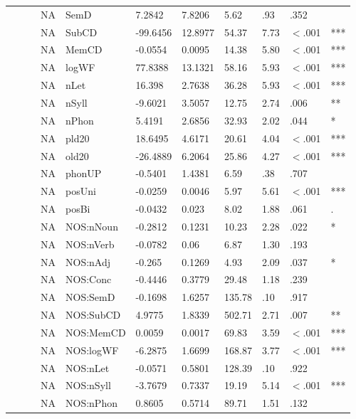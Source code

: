 \begin{table}[ht]
\begin{tabular}{lllllllllll}
   &  &  & NA & SemD & 7.2842 & 7.8206 & 5.62 & .93 & .352 &   \\ 
   &  &  & NA & SubCD & -99.6456 & 12.8977 & 54.37 & 7.73 & $<$.001 & *** \\ 
   &  &  & NA & MemCD & -0.0554 & 0.0095 & 14.38 & 5.80 & $<$.001 & *** \\ 
   &  &  & NA & logWF & 77.8388 & 13.1321 & 58.16 & 5.93 & $<$.001 & *** \\ 
   &  &  & NA & nLet & 16.398 & 2.7638 & 36.28 & 5.93 & $<$.001 & *** \\ 
   &  &  & NA & nSyll & -9.6021 & 3.5057 & 12.75 & 2.74 & .006 & ** \\ 
   &  &  & NA & nPhon & 5.4191 & 2.6856 & 32.93 & 2.02 & .044 & * \\ 
   &  &  & NA & pld20 & 18.6495 & 4.6171 & 20.61 & 4.04 & $<$.001 & *** \\ 
   &  &  & NA & old20 & -26.4889 & 6.2064 & 25.86 & 4.27 & $<$.001 & *** \\ 
   &  &  & NA & phonUP & -0.5401 & 1.4381 & 6.59 & .38 & .707 &   \\ 
   &  &  & NA & posUni & -0.0259 & 0.0046 & 5.97 & 5.61 & $<$.001 & *** \\ 
   &  &  & NA & posBi & -0.0432 & 0.023 & 8.02 & 1.88 & .061 & . \\ 
   &  &  & NA & NOS:nNoun & -0.2812 & 0.1231 & 10.23 & 2.28 & .022 & * \\ 
   &  &  & NA & NOS:nVerb & -0.0782 & 0.06 & 6.87 & 1.30 & .193 &   \\ 
   &  &  & NA & NOS:nAdj & -0.265 & 0.1269 & 4.93 & 2.09 & .037 & * \\ 
   &  &  & NA & NOS:Conc & -0.4446 & 0.3779 & 29.48 & 1.18 & .239 &   \\ 
   &  &  & NA & NOS:SemD & -0.1698 & 1.6257 & 135.78 & .10 & .917 &   \\ 
   &  &  & NA & NOS:SubCD & 4.9775 & 1.8339 & 502.71 & 2.71 & .007 & ** \\ 
   &  &  & NA & NOS:MemCD & 0.0059 & 0.0017 & 69.83 & 3.59 & $<$.001 & *** \\ 
   &  &  & NA & NOS:logWF & -6.2875 & 1.6699 & 168.87 & 3.77 & $<$.001 & *** \\ 
   &  &  & NA & NOS:nLet & -0.0571 & 0.5801 & 128.39 & .10 & .922 &   \\ 
   &  &  & NA & NOS:nSyll & -3.7679 & 0.7337 & 19.19 & 5.14 & $<$.001 & *** \\ 
   &  &  & NA & NOS:nPhon & 0.8605 & 0.5714 & 89.71 & 1.51 & .132 &   \\ 

\end{tabular}
\end{table}
